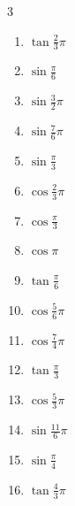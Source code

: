 \begin{multicols}{3}
\begin{enumerate}
  \item $\displaystyle \tan{\frac{2}{3}\pi}$

  \item $\displaystyle \sin{\frac{\pi}{6}}$

  \item $\displaystyle \sin{\frac{3}{2}\pi}$
        \phantom{$\displaystyle =-1$}

  \item $\displaystyle \sin{\frac{7}{6}\pi}$

  \item $\displaystyle \sin{\frac{\pi}{3}}$

  \item $\displaystyle \cos{\frac{2}{3}\pi}$

  \item $\displaystyle \cos{\frac{\pi}{3}}$

  \item $\displaystyle \cos{\pi}$
        \phantom{$\displaystyle =-1$}

  \item $\displaystyle \tan{\frac{\pi}{6}}$

  \item $\displaystyle \cos{\frac{5}{6}\pi}$

  \item $\displaystyle \cos{\frac{7}{4}\pi}$

  \item $\displaystyle \tan{\frac{\pi}{3}}$

  \item $\displaystyle \cos{\frac{5}{3}\pi}$

  \item $\displaystyle \sin{\frac{11}{6}\pi}$

  \item $\displaystyle \sin{\frac{\pi}{4}}$

  \item $\displaystyle \tan{\frac{4}{3}\pi}$


\end{enumerate}
\end{multicols}
